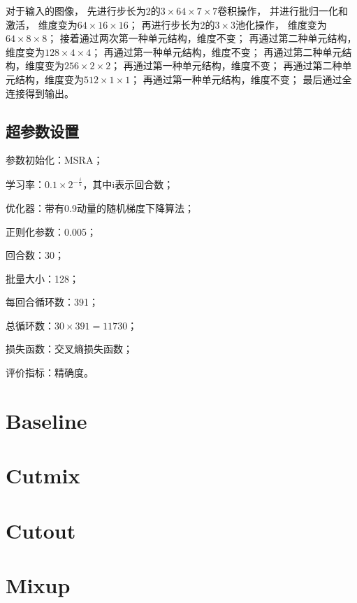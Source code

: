 \documentclass{article}
\begin{document}
对于输入的图像，
先进行步长为2的$3\times64\times7\times7$卷积操作，
并进行批归一化和激活，
维度变为$64\times16\times16$；
再进行步长为2的$3\times3$池化操作，
维度变为$64\times8\times8$；
接着通过两次第一种单元结构，维度不变；
再通过第二种单元结构，维度变为$128\times4\times4$；
再通过第一种单元结构，维度不变；
再通过第二种单元结构，维度变为$256\times2\times2$；
再通过第一种单元结构，维度不变；
再通过第二种单元结构，维度变为$512\times1\times1$；
再通过第一种单元结构，维度不变；
最后通过全连接得到输出。

\subsection{超参数设置}

参数初始化：MSRA；

学习率：$ 0.1 \times 2^{-\frac{i}{5}} $，其中i表示回合数；

优化器：带有0.9动量的随机梯度下降算法；

正则化参数：0.005；

回合数：30；

批量大小：128；

每回合循环数：391；

总循环数：$ 30 \times 391 = 11730 $；

损失函数：交叉熵损失函数；

评价指标：精确度。

\section{Baseline}

\section{Cutmix}

\section{Cutout}

\section{Mixup}
\end{document}
